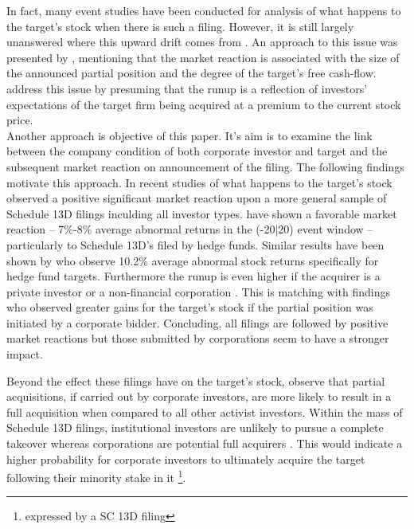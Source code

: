 \documentclass[12pt]{article}
\begin{document}
In fact, many event studies have been conducted for analysis of what happens to the target's stock when there is such a filing. However, it is still largely unanswered where this upward drift comes from \citep{Greenwood2009}. An approach to this issue was presented by \citet{Akhigbe2007}, mentioning that the market reaction is associated with the size of the announced partial position and the degree of the target's free cash-flow.
\citet{Greenwood2009} address this issue by presuming that the runup is a reflection of investors' expectations of the target firm being acquired at a premium to the current stock price.\\ 
Another approach is objective of this paper. It's aim is to examine the link between the company condition of both corporate investor and target and the subsequent market reaction on announcement of the filing. %
The following findings motivate this approach.  
In recent studies of what happens to the target's stock  \citet{Collin-Dufresne2015} observed a positive significant market reaction upon a more general sample of Schedule 13D filings inculding all investor types. \citet{Brav2008} have shown a favorable market reaction -- 7\%-8\% average abnormal returns in the (-20|20) event window -- particularly to Schedule 13D's filed by hedge funds. Similar results have been shown by \citet{Klein2009} who observe 10.2\% average abnormal stock returns specifically for hedge fund targets. Furthermore the runup is even higher if the acquirer is a private investor or a non-financial corporation \citep{Brigida2012}. This is matching with \citet{Akhigbe2007} findings who observed greater gains for the target's stock if the partial position was initiated by a corporate bidder. Concluding, all filings are followed by positive market reactions but those submitted by corporations seem to have a stronger impact. 

Beyond the effect these filings have on the target's stock, \citet{Akhigbe2007} observe that partial acquisitions, if carried out by corporate investors, are more likely to result in a full acquisition when compared to all other activist investors. Within the mass of Schedule 13D filings, institutional investors are unlikely to pursue a complete takeover whereas corporations are potential full acquirers \citep{Brigida2012}. This would indicate a higher probability for corporate investors to ultimately acquire the target following their minority stake in it \citep{Greenwood2009} \footnote{expressed by a SC 13D filing}. 
\end{document}
